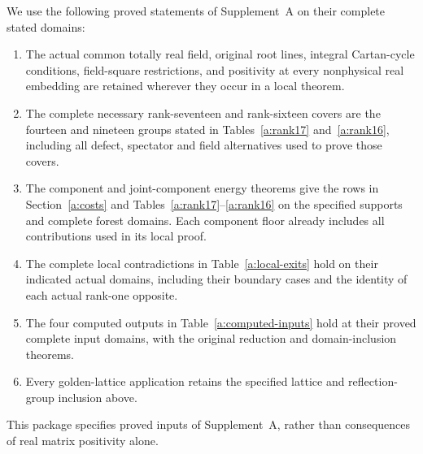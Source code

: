 \begin{assumption}
\label{a:input-package}
We use the following proved statements of Supplement~A on their complete
stated domains:
\begin{enumerate}[label=\textup{(\roman*)},leftmargin=*]
\item The actual common totally real field, original root lines,
 integral Cartan-cycle conditions, field-square restrictions, and
 positivity at every nonphysical real embedding are retained wherever
 they occur in a local theorem.
\item The complete necessary rank-seventeen and rank-sixteen covers
 are the fourteen and nineteen groups stated in
 Tables~\ref{a:rank17} and~\ref{a:rank16}, including all defect,
 spectator and field alternatives used to prove those covers.
\item The component and joint-component energy theorems give the rows
 in Section~\ref{a:costs} and Tables~\ref{a:rank17}--\ref{a:rank16}
 on the specified supports and complete forest domains. Each component
 floor already includes all contributions used in its local proof.
\item The complete local contradictions in Table~\ref{a:local-exits}
 hold on their indicated actual domains, including their boundary
 cases and the identity of each actual rank-one opposite.
\item The four computed outputs in
 Table~\ref{a:computed-inputs} hold at their proved complete input
 domains, with the original reduction and domain-inclusion theorems.
\item Every golden-lattice application retains the specified lattice
 and reflection-group inclusion above.
\end{enumerate}
\end{assumption}

This package specifies proved inputs of Supplement~A, rather than
consequences of real matrix positivity alone.

